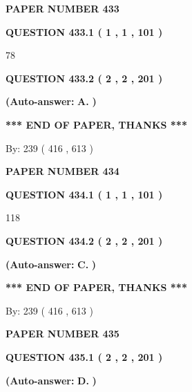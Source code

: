 \documentclass[12pt]{article}
\begin{document}
   
\newpage 
\setcounter{page}{ 
   433001 } 
   
   
 {\textbf{ \Large{ PAPER NUMBER  433  }}}
   
   
   
   
  
  
{\textbf{\large{QUESTION
433.1 
 ( 1 , 1 , 101 )
}}}

78
  
  
{\textbf{\large{QUESTION
433.2 
 ( 2 , 2 , 201 )
}}}
 
 
{\textbf{(Auto-answer:}}
{\textbf{\large{
A.}}}
{\textbf{)}}
 
 
   
   
   
   
\vspace{1.0in} 
{\textbf{\large{ *** END OF PAPER, THANKS *** }}} 
   
   
\hspace{1.0in} By: 
 239 ( 416 ,  613 )
   
   
   
   
\newpage 
\setcounter{page}{ 
   434001 } 
   
   
 {\textbf{ \Large{ PAPER NUMBER  434  }}}
   
   
   
   
  
  
{\textbf{\large{QUESTION
434.1 
 ( 1 , 1 , 101 )
}}}

118
  
  
{\textbf{\large{QUESTION
434.2 
 ( 2 , 2 , 201 )
}}}
 
 
{\textbf{(Auto-answer:}}
{\textbf{\large{
C.}}}
{\textbf{)}}
 
 
   
   
   
   
\vspace{1.0in} 
{\textbf{\large{ *** END OF PAPER, THANKS *** }}} 
   
   
\hspace{1.0in} By: 
 239 ( 416 ,  613 )
   
   
   
   
\newpage 
\setcounter{page}{ 
   435001 } 
   
   
 {\textbf{ \Large{ PAPER NUMBER  435  }}}
   
   
   
   
  
  
{\textbf{\large{QUESTION
435.1 
 ( 2 , 2 , 201 )
}}}
 
 
{\textbf{(Auto-answer:}}
{\textbf{\large{
D.}}}
{\textbf{)}}
 
 
  
\end{document}
